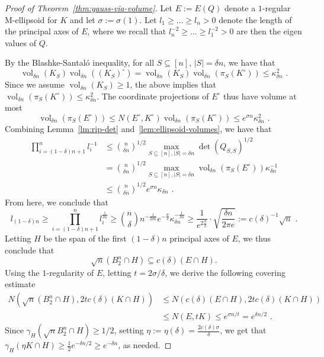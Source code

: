 \documentclass[12pt]{article}
\DeclareMathOperator{\vol}{vol}
\begin{document}
\begin{proof}[Proof of Theorem~\ref{thm:gauss-via-volume}]
Let $E := E(Q)$ denote a $1$-regular M-ellipsoid for $K$ and let $\sigma :=
\sigma(1)$. Let $l_1 \geq \dots \geq l_n > 0$ denote
the length of the principal axes of $E$, where we recall that
$l_n^{-2}\geq \dots \geq l_1^{-2} > 0$ are then the eigen values of $Q$.

By the Blashke-Santal{\'o} inequality, for all $S \subseteq
[n]$, $|S|=\delta n$, we have that 
\[
\vol_{\delta n}(K_S)\vol_{\delta n}((K_S)^\circ) = 
\vol_{\delta n}(K_S) \vol_{\delta n}(\pi_S(K^\circ)) \leq
\kappa_{\delta n}^2 \text{ .}
\]
Since we assume $\vol_{\delta n}(K_S) \geq 1$, the above implies that
$\vol_{\delta n}(\pi_S(K^\circ)) \leq \kappa_{\delta n}^2$. The
coordinate projections of $E^\circ$ thus have volume at most 
\[
\vol_{\delta n}(\pi_S(E^\circ)) \leq N(E^\circ,K^\circ)
\vol_{ \delta n}(\pi_S(K^\circ)) \leq e^{\sigma n} \kappa_{\delta n}^2 \text{ .}
\]
Combining Lemma~\ref{lm:rip-det} and~\ref{lem:ellipsoid-volumes}, we have that
\begin{align*}
\prod_{i=(1-\delta)n+1}^n l_i^{-1} &\leq \binom{n}{\delta n}^{1/2} \max_{S \subseteq
[n],|S|=\delta n} \det(Q_{S,S})^{1/2} \\
&= \binom{n}{\delta n}^{1/2} \max_{S \subseteq [n],|S|=\delta n}
\vol_{\delta n}(\pi_S(E^\circ)) \kappa_{\delta n}^{-1} \\
&\leq \binom{n}{\delta n}^{1/2} e^{\sigma n} \kappa_{\delta n} \text{ .}
\end{align*}
From here, we conclude that 
\[
l_{(1-\delta)n} \geq \prod_{i=(1-\delta)n+1}^n l_i^{\frac{1}{\delta
n}} \geq \binom{n}\delta {
n}^{-\frac{1}{2\delta n}} e^{-\frac{\sigma}{\delta }} \kappa_{\delta
n}^{-\frac{1}{\delta n}} \geq 
\frac{1}{e^{2\frac{\sigma}{\delta }}} \cdot \sqrt{\frac{\delta n}{2\pi e}} :=
c(\delta)^{-1} \sqrt{n} \text{ .}
\] 
Letting $H$ be the span of the first $(1-\delta)n$ principal
axes of $E$, we thus conclude that 
\[
\sqrt{n} (B_2^n \cap H) \subseteq c(\delta) (E \cap H). 
\]
Using the $1$-regularity of $E$, letting $t = 2 \sigma / \delta$, we derive the
following covering estimate 
\begin{align*}
N(\sqrt{n} (B_2^n \cap H), 2 t c(\delta) (K \cap H))
&\leq N(c(\delta)(E \cap H), 2 t c(\delta) (K \cap H)) \\
&\leq N(E, t K) \leq e^{\sigma n / t} = e^{\delta n/2} \text{ .}
\end{align*}
Since $\gamma_H(\sqrt{n} B_2^n \cap H) \geq 1/2$, setting $\eta := \eta(\delta)
=\frac{2c(\delta)\sigma}{\delta}$, we get that $\gamma_H(\eta K \cap H) \geq
\frac{1}{2} e^{-\delta n/2} \geq e^{-\delta n}$, as needed.
\end{proof}
\end{document}
